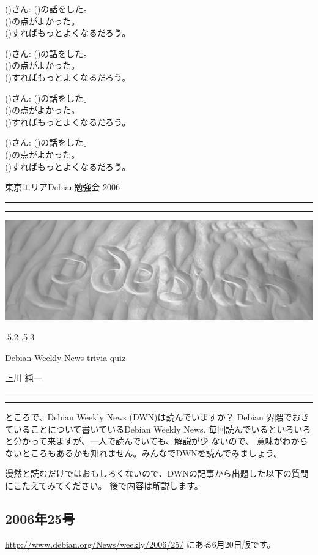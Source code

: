 \documentclass[mingoth,a4paper]{jsarticle}
\makeatletter
\renewcommand{\section}{\@startsection{section}{1}{\z@}%
    {\Cvs \@plus.5\Cdp \@minus.2\Cdp}%
    {.5\Cvs \@plus.3\Cdp}%
    {\normalfont\Huge\headfont\raggedright\centering}} %
\newcommand{\dancersection}[2]{%
\newpage
東京エリアDebian勉強会 2006
\hrule
\vspace{0.5mm}
\hrule
\includegraphics[width=16cm]{image2006-natsu/guruguru-sand-light.png}\\
\vspace{-5cm}
\begin{center}
\section{#1}
\end{center}
\hfill{}\colorbox{white}{#2}\hspace{3cm}\space\\
\vspace{1cm}
\hrule
\vspace{0.5mm}
\hrule
\vspace{1cm}
}
\makeatother
\begin{document}
{\LARGE 
(\hspace{5cm})さん: (\hspace{5cm})の話をした。\\
(\hspace{6cm})の点がよかった。\\
(\hspace{6cm})すればもっとよくなるだろう。\\
}

{\LARGE 
(\hspace{5cm})さん: (\hspace{5cm})の話をした。\\
(\hspace{6cm})の点がよかった。\\
(\hspace{6cm})すればもっとよくなるだろう。\\
}

{\LARGE 
(\hspace{5cm})さん: (\hspace{5cm})の話をした。\\
(\hspace{6cm})の点がよかった。\\
(\hspace{6cm})すればもっとよくなるだろう。\\
}

{\LARGE 
(\hspace{5cm})さん: (\hspace{5cm})の話をした。\\
(\hspace{6cm})の点がよかった。\\
(\hspace{6cm})すればもっとよくなるだろう。\\
}

\dancersection{Debian Weekly News trivia quiz}{上川 純一}

ところで、Debian Weekly News (DWN)は読んでいますか？
Debian 界隈でおきていることについて書いているDebian Weekly News.
毎回読んでいるといろいろと分かって来ますが、一人で読んでいても、解説が少
ないので、
意味がわからないところもあるかも知れません。みんなでDWNを読んでみましょう。

漫然と読むだけではおもしろくないので、DWNの記事から出題した以下の質問にこたえてみてください。
後で内容は解説します。

\subsection{2006年25号}
\url{http://www.debian.org/News/weekly/2006/25/}
にある6月20日版です。
\end{document}
